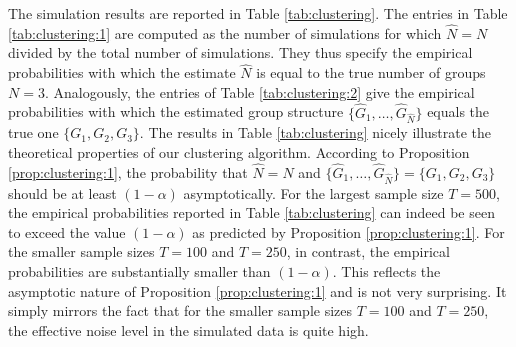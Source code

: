 \documentclass[12pt]{article}
\begin{document}
The simulation results are reported in Table \ref{tab:clustering}. The entries in Table \ref{tab:clustering:1} are computed as the number of simulations for which $\widehat{N} = N$ divided by the total number of simulations. They thus specify the empirical probabilities with which the estimate $\widehat{N}$ is equal to the true number of groups $N = 3$. Analogously, the entries of Table \ref{tab:clustering:2} give the empirical probabilities with which the estimated group structure $\{ \widehat{G}_1,\ldots,\widehat{G}_{\widehat{N}}\}$ equals the true one $\{G_1,G_2,G_3\}$. The results in Table \ref{tab:clustering} nicely illustrate the theoretical properties of our clustering algorithm. According to Proposition \ref{prop:clustering:1}, the probability that $\widehat{N} = N$ and $\{ \widehat{G}_1,\ldots,\widehat{G}_{\widehat{N}}\} = \{G_1,G_2,G_3\}$ should be at least $(1-\alpha)$ asymptotically. For the largest sample size $T = 500$, the empirical probabilities reported in Table \ref{tab:clustering} can indeed be seen to exceed the value $(1-\alpha)$ as predicted by Proposition \ref{prop:clustering:1}. For the smaller sample sizes $T=100$ and $T=250$, in contrast, the empirical probabilities are substantially smaller than $(1-\alpha)$. This reflects the asymptotic nature of Proposition \ref{prop:clustering:1} and is not very surprising. It simply mirrors the fact that for the smaller sample sizes $T=100$ and $T=250$, the effective noise level in the simulated data is quite high.
\end{document}
